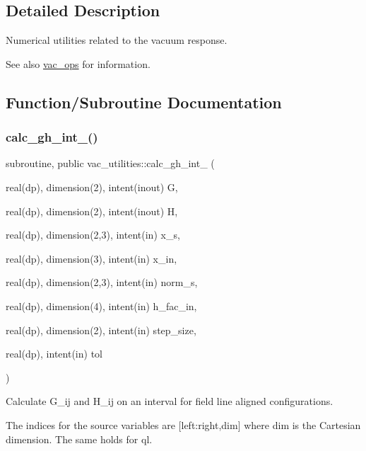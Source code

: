\subsection{Detailed Description}
Numerical utilities related to the vacuum response. 

\begin{DoxySeeAlso}{See also}
\hyperlink{namespacevac__ops}{vac\+\_\+ops} for information. 
\end{DoxySeeAlso}


\subsection{Function/\+Subroutine Documentation}
\mbox{\label{namespacevac__utilities_aa8859980354d180445ed0437d7f51bcd}} 
\subsubsection{\texorpdfstring{calc\+\_\+gh\+\_\+int\+\_()}{calc\_gh\_int\_1()}}
{\footnotesize\ttfamily subroutine, public vac\+\_\+utilities\+::calc\+\_\+gh\+\_\+int\+\_ (\begin{DoxyParamCaption}\item[{real(dp), dimension(2), intent(inout)}]{G,  }\item[{real(dp), dimension(2), intent(inout)}]{H,  }\item[{real(dp), dimension(2,3), intent(in)}]{x\+\_\+s,  }\item[{real(dp), dimension(3), intent(in)}]{x\+\_\+in,  }\item[{real(dp), dimension(2,3), intent(in)}]{norm\+\_\+s,  }\item[{real(dp), dimension(4), intent(in)}]{h\+\_\+fac\+\_\+in,  }\item[{real(dp), dimension(2), intent(in)}]{step\+\_\+size,  }\item[{real(dp), intent(in)}]{tol }\end{DoxyParamCaption})}



Calculate G\+\_\+ij and H\+\_\+ij on an interval for field line aligned configurations. 

The indices for the source variables are {\ttfamily \mbox{[}left\+:right,dim\mbox{]}} where {\ttfamily dim} is the Cartesian dimension. The same holds for {\ttfamily ql}.


